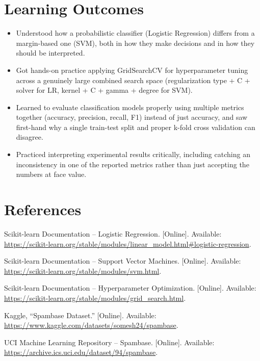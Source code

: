 \documentclass[12pt,a4paper]{article}
\begin{document}
\section{Learning Outcomes}
\begin{itemize}
\item Understood how a probabilistic classifier (Logistic Regression) differs from a margin-based one (SVM), both in how they make decisions and in how they should be interpreted.
\item Got hands-on practice applying GridSearchCV for hyperparameter tuning across a genuinely large combined search space (regularization type + C + solver for LR, kernel + C + gamma + degree for SVM).
\item Learned to evaluate classification models properly using multiple metrics together (accuracy, precision, recall, F1) instead of just accuracy, and saw first-hand why a single train-test split and proper k-fold cross validation can disagree.
\item Practiced interpreting experimental results critically, including catching an inconsistency in one of the reported metrics rather than just accepting the numbers at face value.
\end{itemize}

\section{References}
\begin{enumerate}[label={[\arabic*]}]
\item Scikit-learn Documentation -- Logistic Regression. [Online]. Available: \url{https://scikit-learn.org/stable/modules/linear_model.html#logistic-regression}.
\item Scikit-learn Documentation -- Support Vector Machines. [Online]. Available: \url{https://scikit-learn.org/stable/modules/svm.html}.
\item Scikit-learn Documentation -- Hyperparameter Optimization. [Online]. Available: \url{https://scikit-learn.org/stable/modules/grid_search.html}.
\item Kaggle, ``Spambase Dataset.'' [Online]. Available: \url{https://www.kaggle.com/datasets/somesh24/spambase}.
\item UCI Machine Learning Repository -- Spambase. [Online]. Available: \url{https://archive.ics.uci.edu/dataset/94/spambase}.
\end{enumerate}
\end{document}
